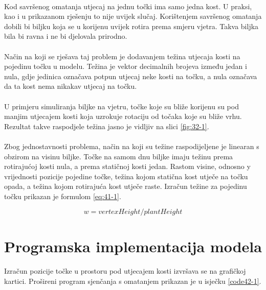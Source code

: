 \documentclass[times, utf8, diplomski]{fer}
\begin{document}
\paragraph{}
Kod savršenog omatanja utjecaj na jednu točki ima samo jedna kost. U praksi, kao i u 
prikazanom rješenju to nije uvijek slučaj. Korištenjem savršenog omatanja dobili bi biljku 
koja se u korijenu uvijek rotira prema smjeru vjetra. Takva biljka bila bi ravna i ne bi 
djelovala prirodno. 

\paragraph{}
Način na koji se rješava taj problem je dodavanjem težina utjecaja kosti na pojedinu točku u 
modelu. Težina je vektor decimalnih brojeva između jedan i nula, gdje jedinica označava 
potpun utjecaj neke kosti na točku, a nula označava da ta kost nema nikakav utjecaj na 
točku.

\paragraph{}
U primjeru simuliranja biljke na vjetru, točke koje su bliže korijenu su pod manjim 
utjecajem kosti koja uzrokuje rotaciju od točaka koje su bliže vrhu. Rezultat takve 
raspodjele težina jasno je vidljiv na slici \ref{fig:32-1}.

\paragraph{}
Zbog jednostavnosti problema, način na koji su težine raspodijeljene je linearan s obzirom 
na visinu biljke. Točke na samom dnu biljke imaju težinu prema rotirajućoj kosti nula, a 
prema statičnoj kosti jedan. Rastom visine, odnosno y vrijednosti pozicije pojedine točke, 
težina kojom statična kost utječe na točku opada, a težina kojom rotirajuća kost utječe 
raste. Izračun težine za pojedinu točku prikazan je formulom \ref{eq:41-1}.

\begin{equation}
w = vertexHeight / plantHeight
\label{eq:41-1}
\end{equation}

\section{Programska implementacija modela}
\paragraph{}
Izračun pozicije točke u prostoru pod utjecajem kosti izvršava se na grafičkoj kartici. Prošireni program sjenčanja s omatanjem prikazan je u isječku \ref{code42-1}.
\end{document}
